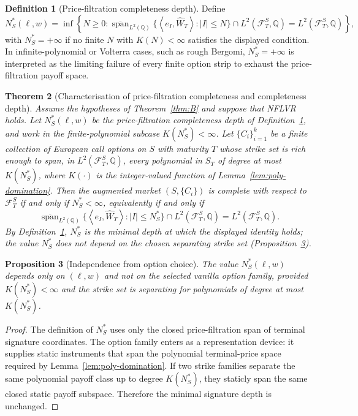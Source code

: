 \documentclass[11pt,oneside]{article}
\theoremstyle{plain}
\newtheorem{theorem}{Theorem}[section]
\newtheorem{proposition}[theorem]{Proposition}
\theoremstyle{definition}
\newtheorem{definition}[theorem]{Definition}
\theoremstyle{remark}
\newcommand{\Q}{\mathbb{Q}}
\newcommand{\cW}{\widehat W}
\newcommand{\FS}{\mathcal F^S}
\newcommand{\inner}[2]{\left\langle #1,#2\right\rangle}
\newcommand{\clspan}{\overline{\operatorname{span}}}
\begin{document}
\begin{definition}[Price-filtration completeness depth]\label{def:price-depth}
Define
\[
N_S^\ast(\ell,w)=\inf\left\{N\geq0:\clspan_{L^2(\Q)}\{\inner{e_I}{\cW_T}: |I|\leq N\}\cap L^2(\FS_T,\Q)=L^2(\FS_T,\Q)\right\},
\]
with $N_S^\ast=+\infty$ if no finite $N$ with $K(N)<\infty$ satisfies the displayed condition. In infinite-polynomial or Volterra cases, such as rough Bergomi, $N_S^\ast=+\infty$ is interpreted as the limiting failure of every finite option strip to exhaust the price-filtration payoff space.
\end{definition}

\begin{theorem}[Characterisation of price-filtration completeness and completeness depth]\label{thm:C}
Assume the hypotheses of Theorem~\ref{thm:B} and suppose that NFLVR
holds. Let $N_S^\ast(\ell,w)$ be the price-filtration completeness depth
of Definition~\ref{def:price-depth}, and work in the finite-polynomial
subcase $K(N_S^\ast)<\infty$. Let $\{C_i\}_{i=1}^{k}$ be a finite
collection of European call options on $S$ with maturity $T$ whose
strike set is rich enough to span, in $L^2(\FS_T,\Q)$, every polynomial
in $S_T$ of degree at most $K(N_S^\ast)$, where $K(\cdot)$ is the
integer-valued function of Lemma~\ref{lem:poly-domination}. Then the
augmented market $(S,\{C_i\})$ is complete with respect to $\FS_T$ if
and only if $N_S^\ast<\infty$, equivalently if and only if
\[
\clspan_{L^2(\Q)}\{\inner{e_I}{\cW_T}: |I|\leq N_S^\ast\}\cap L^2(\FS_T,\Q)=L^2(\FS_T,\Q).
\]
By Definition~\ref{def:price-depth}, $N_S^\ast$ is the minimal depth at
which the displayed identity holds; the value $N_S^\ast$ does not depend
on the chosen separating strike set
(Proposition~\ref{prop:option-independence}).
\end{theorem}

\begin{proposition}[Independence from option choice]\label{prop:option-independence}
The value $N_S^\ast(\ell,w)$ depends only on $(\ell,w)$ and not on the selected vanilla option family, provided $K(N_S^\ast)<\infty$ and the strike set is separating for polynomials of degree at most $K(N_S^\ast)$.
\end{proposition}

\begin{proof}
The definition of $N_S^\ast$ uses only the closed price-filtration span of terminal signature coordinates. The option family enters as a representation device: it supplies static instruments that span the polynomial terminal-price space required by Lemma~\ref{lem:poly-domination}. If two strike families separate the same polynomial payoff class up to degree $K(N_S^\ast)$, they staticly span the same closed static payoff subspace. Therefore the minimal signature depth is unchanged.
\end{proof}
\end{document}
